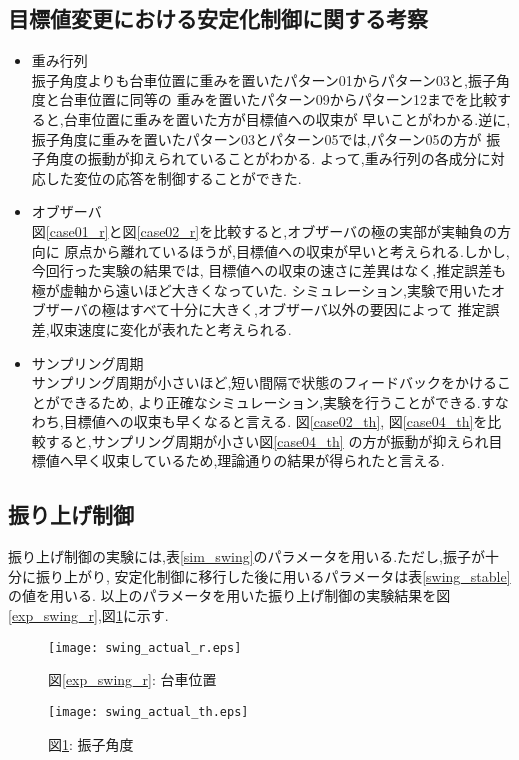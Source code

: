 \subsection{目標値変更における安定化制御に関する考察}
\begin{itemize}
    \item 重み行列 \\
        振子角度よりも台車位置に重みを置いたパターン01からパターン03と,振子角度と台車位置に同等の
        重みを置いたパターン09からパターン12までを比較すると,台車位置に重みを置いた方が目標値への収束が
        早いことがわかる.逆に,振子角度に重みを置いたパターン03とパターン05では,パターン05の方が
        振子角度の振動が抑えられていることがわかる.
        よって,重み行列の各成分に対応した変位の応答を制御することができた.
    \item オブザーバ \\
        図\ref{case01_r}と図\ref{case02_r}を比較すると,オブザーバの極の実部が実軸負の方向に
        原点から離れているほうが,目標値への収束が早いと考えられる.しかし,今回行った実験の結果では,
        目標値への収束の速さに差異はなく,推定誤差も極が虚軸から遠いほど大きくなっていた.
        シミュレーション,実験で用いたオブザーバの極はすべて十分に大きく,オブザーバ以外の要因によって
        推定誤差,収束速度に変化が表れたと考えられる.
    \item サンプリング周期 \\
        サンプリング周期が小さいほど,短い間隔で状態のフィードバックをかけることができるため,
        より正確なシミュレーション,実験を行うことができる.すなわち,目標値への収束も早くなると言える.
        図\ref{case02_th}, 図\ref{case04_th}を比較すると,サンプリング周期が小さい図\ref{case04_th}
        の方が振動が抑えられ目標値へ早く収束しているため,理論通りの結果が得られたと言える.
\end{itemize}


\subsection{振り上げ制御}
振り上げ制御の実験には,表\ref{sim_swing}のパラメータを用いる.ただし,振子が十分に振り上がり,
安定化制御に移行した後に用いるパラメータは表\ref{swing_stable}の値を用いる.
以上のパラメータを用いた振り上げ制御の実験結果を図\ref{exp_swing_r},図\ref{exp_swing_th}に示す.

\begin{figure}[htbp]
    \begin{minipage}{0.5\hsize}
        \begin{center}
            \texttt{[image: swing\_actual\_r.eps]}
            \caption{図\ref{exp_swing_r}: 台車位置}
            \label{exp_swing_r}
        \end{center}
    \end{minipage}
    \begin{minipage}{0.5\hsize}
        \begin{center}
            \texttt{[image: swing\_actual\_th.eps]}
            \caption{図\ref{exp_swing_th}: 振子角度}
            \label{exp_swing_th}
        \end{center}
    \end{minipage}
\end{figure}

